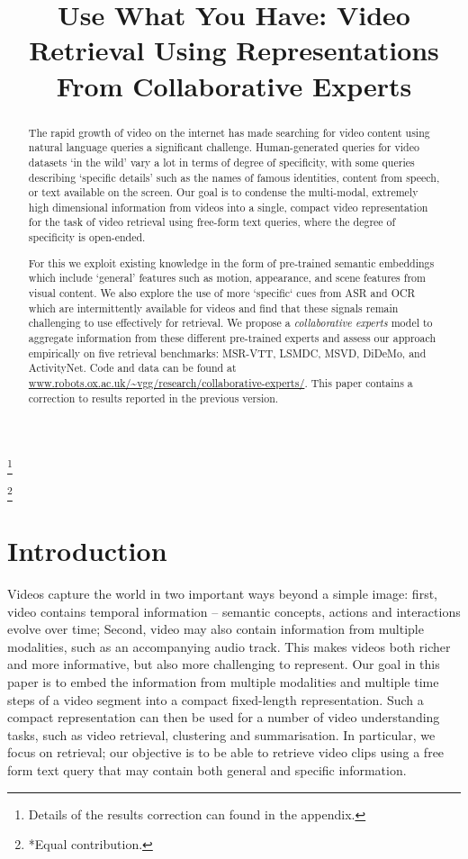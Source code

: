 \documentclass{bmvc2k}
\title{Use What You Have: Video Retrieval Using Representations From Collaborative Experts}
\newcommand\blfootnote[1]{\begingroup
  \renewcommand\thefootnote{}\footnote{#1}\addtocounter{footnote}{-1}\endgroup
}
\begin{document}
\maketitle
\blfootnote{\hspace{-0.55cm} Details of the results correction can found in the appendix.}
\blfootnote{\hspace{-0.55cm} *Equal contribution.}




\begin{abstract}

 The rapid growth of video on the internet has made searching
 for video content using natural language queries a significant
 challenge. Human-generated queries for video datasets `in the wild'
 vary a lot in terms of degree of specificity, with some queries
 describing `specific details' such as the names of famous identities,
 content from speech, or text available on the screen. Our goal is to
 condense the multi-modal, extremely high dimensional information from videos into a single, compact video representation for the task of video retrieval
 using free-form text queries, where the degree of specificity is
 open-ended. 

For this we exploit existing knowledge in the form of pre-trained semantic embeddings which include `general' features such as motion, appearance, and scene features from visual content. We also explore the use of more `specific` cues from ASR and OCR which are intermittently available for videos and find that these signals remain challenging to use effectively for retrieval. We propose a \textit{collaborative experts} model to aggregate information from these different pre-trained experts and assess our approach empirically on five retrieval benchmarks: MSR-VTT, LSMDC, MSVD, DiDeMo, and ActivityNet.  Code and data can be found at \url{www.robots.ox.ac.uk/~vgg/research/collaborative-experts/}. This paper contains a correction to results reported in the previous version.
 \end{abstract} \section{Introduction} 
 
Videos capture the world in two important ways
beyond a simple  image: first, video contains temporal information --
semantic concepts, actions and interactions  evolve over time; Second,
video may also contain information from multiple modalities, such as
an accompanying audio track. This makes videos both richer and more informative, but also more
challenging to represent.
Our goal in this paper is to embed the information from multiple modalities 
and multiple time steps of a video segment into a compact fixed-length
representation. Such a compact representation can then be used for a
number of video understanding tasks, such as video retrieval, clustering and summarisation. In particular, we focus on retrieval; our objective is to be able to retrieve
video clips using a free form text query that may contain both general and specific information.
\end{document}
